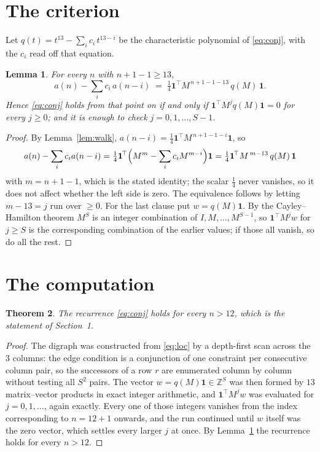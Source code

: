 \documentclass[11pt,a4paper]{article}
\theoremstyle{plain}
\newtheorem{theorem}{Theorem}
\newtheorem{lemma}[theorem]{Lemma}
\theoremstyle{definition}
\begin{document}
\section{The criterion}

Let $q(t)=t^{13}-\sum_i c_i\,t^{13-i}$ be the characteristic polynomial of
\eqref{eq:conj}, with the $c_i$ read off that equation.

\begin{lemma}\label{lem:crit}
For every $n$ with $n+1-1\ge13$,
\[
a(n)-\sum_i c_i\,a(n-i)\;=\;\tfrac1{4}\mathbf{1}^{\!\top}M^{\,n+1-1-13}\,q(M)\,\mathbf{1} .
\]
Hence \eqref{eq:conj} holds from that point on if and only if
$\mathbf{1}^{\!\top}M^{j}q(M)\mathbf{1}=0$ for every $j\ge0$; and it is enough to check
$j=0,1,\dots,S-1$.
\end{lemma}

\begin{proof}
By Lemma~\ref{lem:walk}, $a(n-i)=\tfrac1{4}\mathbf{1}^{\!\top}M^{\,n+1-1-i}\mathbf{1}$, so
\[
a(n)-\sum_i c_i a(n-i)
=\tfrac1{4}\mathbf{1}^{\!\top}\Bigl(M^{m}-\sum_i c_i M^{m-i}\Bigr)\mathbf{1}
=\tfrac1{4}\mathbf{1}^{\!\top}M^{\,m-13}\,q(M)\,\mathbf{1}
\]
with $m=n+1-1$, which is the stated identity; the scalar $\tfrac1{4}$ never vanishes, so
it does not affect whether the left side is zero. The equivalence follows by letting
$m-13=j$ run over $\ge0$. For the last clause put $w=q(M)\mathbf{1}$. By the
Cayley--Hamilton theorem $M^{S}$ is an integer combination of $I,M,\dots,M^{S-1}$, so
$\mathbf{1}^{\!\top}M^{j}w$ for $j\ge S$ is the corresponding combination of the earlier
values; if those all vanish, so do all the rest.
\end{proof}

\section{The computation}

\begin{theorem}
The recurrence \eqref{eq:conj} holds for every $n>12$, which is the statement of
Section~1.
\end{theorem}

\begin{proof}
The digraph was constructed from \eqref{eq:loc} by a depth-first scan across the $3$
columns: the edge condition is a conjunction of one constraint per consecutive column
pair, so the successors of a row $r$ are enumerated column by column without testing all
$S^2$ pairs. The vector $w=q(M)\mathbf{1}\in\mathbb{Z}^{S}$ was then formed by $13$
matrix--vector products in exact integer arithmetic, and $\mathbf{1}^{\!\top}M^{j}w$ was
evaluated for $j=0,1,\dots$, again exactly. Every one of those integers vanishes from the
index corresponding to $n=12+1$ onwards, and the run continued until $w$ itself was the
zero vector, which settles every larger $j$ at once. By Lemma~\ref{lem:crit} the recurrence
holds for every $n>12$.
\end{proof}
\end{document}
